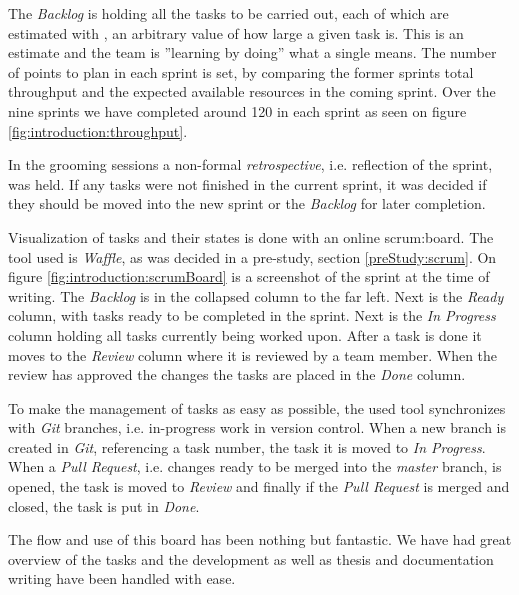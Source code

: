 The \textit{Backlog} is holding all the tasks to be carried out, each of which are estimated with , an arbitrary value of how large a given task is.
This is an estimate and the team is ''learning by doing'' what a single  means.
The number of points to plan in each sprint is set, by comparing the former sprints total throughput and the expected available resources in the coming sprint.
Over the nine sprints we have completed around 120  in each sprint as seen on figure \ref{fig:introduction:throughput}.


In the grooming sessions a non-formal \textit{retrospective}, i.e. reflection of the sprint, was held. 
If any tasks were not finished in the current sprint, it was decided if they should be moved into the new sprint or the \textit{Backlog} for later completion.

Visualization of tasks and their states is done with an online \gls{scrum:board}.
The tool used is \textit{Waffle}, as was decided in a pre-study, section \ref{preStudy:scrum}.
On figure \ref{fig:introduction:scrumBoard} is a screenshot of the sprint at the time of writing.
The \textit{Backlog} is in the collapsed column to the far left.
Next is the \textit{Ready} column, with tasks ready to be completed in the sprint.
Next is the \textit{In Progress} column holding all tasks currently being worked upon.
After a task is done it moves to the \textit{Review} column where it is reviewed by a team member.
When the review has approved the changes the tasks are placed in the \textit{Done} column.


To make the management of tasks as easy as possible, the used tool synchronizes with \textit{Git} branches, i.e. in-progress work in version control. 
When a new branch is created in \textit{Git}, referencing a task number, the task it is moved to \textit{In Progress}. 
When a \textit{Pull Request}, i.e. changes ready to be merged into the \textit{master} branch, is opened, the task is moved to \textit{Review} and finally if the \textit{Pull Request} is merged and closed, the task is put in \textit{Done}.

The flow and use of this board has been nothing but fantastic.
We have had great overview of the tasks and the development as well as thesis and documentation writing have been handled with ease.

